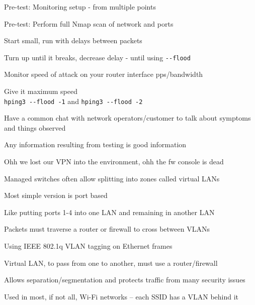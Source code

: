 \documentclass[Screen16to9,17pt]{foils}
\begin{document}
\begin{list2}
\item Pre-test: Monitoring setup - from multiple points
\item Pre-test: Perform full Nmap scan of network and ports
\item Start small, run with delays between packets
\item Turn up until it breaks, decrease delay - until using \verb+--flood+
\item Monitor speed of attack on your router interface pps/bandwidth
\item Give it maximum speed\\
 \verb+hping3 --flood -1+ and \verb+hping3 --flood -2+
\item Have a common chat with network operators/customer to talk about symptoms and things observed
\item Any information resulting from testing is good information
\end{list2}

\vskip 1cm
\centerline{Ohh we lost our VPN into the environment, ohh the fw console is dead}




\begin{list1}
\item Managed switches often allow splitting into zones called virtual LANs
\item Most simple version is port based
\item Like putting ports 1-4 into one LAN and remaining in another LAN
\item Packets must traverse a router or firewall to cross between VLANs
\end{list1}



\begin{list1}
\item Using IEEE 802.1q  VLAN tagging on Ethernet frames
\item Virtual LAN, to pass from one to another, must use a router/firewall
\item Allows separation/segmentation and protects traffic from many security issues
\item Used in most, if not all, Wi-Fi networks -- each SSID has a VLAN behind it
\end{list1}
\end{document}

